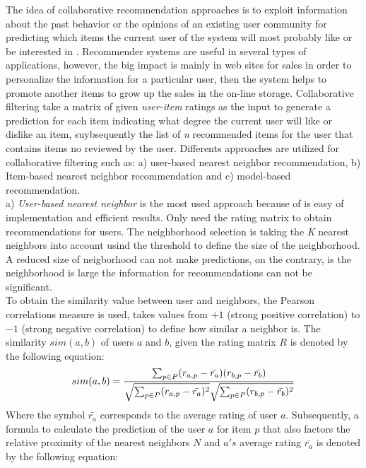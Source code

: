 The idea of collaborative recommendation approaches is to exploit
information about the past behavior or the opinions of an existing
user community for predicting which items the current user of the
system will most probably like or be interested in
\cite{anIntroduction}. Recommender systems are useful in several types
of  applications, however, the big impact is mainly in web sites for
sales in order to  personalize the information for a particular user,
then the system helps to  promote another items to grow up the sales
in the on-line storage. Collaborative filtering  take a matrix of
given \textit{user-item} ratings as the input to generate a prediction
for each item  indicating what degree the current user will like or
dislike  an item, suybsequently the list of \textit{n} recommended
items for the user that contains items no reviewed by the user.
Differents approaches are utilized for collaborative filtering such
as:  a) user-based nearest neighbor recommendation, b) Item-based
nearest neighbor  recommendation and c) model-based recommendation.\\
a) \textit{User-based nearest neighbor} is the most used approach because
of is easy of implementation and efficient results. Only need the
rating matrix to obtain recommendations for users. The neighborhood
selection is taking the \textit{K} nearest neighbors into account
usind the threshold to define  the size of the neighborhood. A reduced
size of neigborhood can not make predictions, on the  contrary, is the
neighborhood is large the information for recommendations can not be
significant.\\ To obtain the similarity value between user and
neighbors, the Pearson correlations measure is used, takes values from
$+1$ (strong positive correlation) to $-1$ (strong negative
correlation) to define how similar a neighbor is. The similarity
$sim(a,b)$ of users $a$ and $b$, given the rating matrix $R$ is
denoted by the following equation:
\begin{equation}\label{eq:pearson1}
\displaystyle sim(a,b) = {\sum_{p \in P}(r_{a,p} - 
\bar{r_a})(r_{b,p}- \bar{r_b}) 
\over \sqrt{\sum_{p \in P}(r_{a,p} - \bar{r_a})^2} 
\sqrt{\sum_{p \in P} 
(r_{b,p}- \bar{r_b})^2}}
\end{equation}
Where the symbol $\bar{r_a}$ corresponds to the average rating of user
$a$. Subsequently, a formula to calculate the prediction of the user
$a$ for item $p$ that also factors the relative proximity of the
nearest neighbors $N$ and $a's$ average rating $\bar{r_a}$ is denoted
by the following equation:
